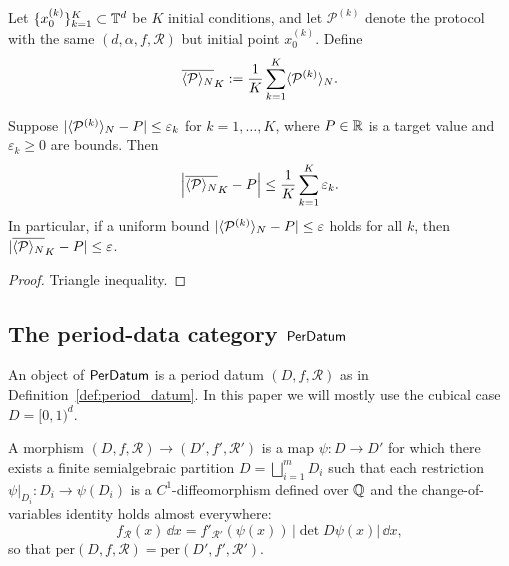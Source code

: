 \begin{definition}
\label{def:ensemble_mean}
Let $\{x_0^{(k)}\}_{k=1}^K\subset\mathbb{T}^d$ be $K$ initial conditions, and let $\mathcal{P}^{(k)}$ denote the protocol with the same $(d,\alpha,f,\mathcal{R})$ but initial point $x_0^{(k)}$. Define
\begin{equation}
\label{eq:ensemble_mean}
\overline{\langle \mathcal{P} \rangle_N}_{K}
:=\frac{1}{K}\sum_{k=1}^K \langle \mathcal{P}^{(k)} \rangle_N.
\end{equation}
\end{definition}

\begin{lemma}
\label{lem:ensemble_preserves_bounds}
Suppose $|\langle \mathcal{P}^{(k)} \rangle_N-P|\le \varepsilon_k$ for $k=1,\dots,K$, where $P\in\mathbb{R}$ is a target value and $\varepsilon_k\ge 0$ are bounds. Then
\[
\left|\overline{\langle \mathcal{P} \rangle_N}_{K}-P\right|
\le
\frac{1}{K}\sum_{k=1}^K \varepsilon_k.
\]
In particular, if a uniform bound $|\langle \mathcal{P}^{(k)} \rangle_N-P|\le \varepsilon$ holds for all $k$, then $|\overline{\langle \mathcal{P} \rangle_N}_{K}-P|\le \varepsilon$.
\end{lemma}

\begin{proof}
Triangle inequality.
\end{proof}

\subsection{The period-data category \texorpdfstring{$\mathsf{PerDatum}$}{PerDatum}}
\label{sec:perdatum_category}

\begin{definition}
\label{def:perdatum_object}
An object of $\mathsf{PerDatum}$ is a period datum $(D,f,\mathcal{R})$ as in Definition~\ref{def:period_datum}. In this paper we will mostly use the cubical case $D=[0,1)^d$.
\end{definition}

\begin{definition}
\label{def:perdatum_morphism}
A morphism $(D,f,\mathcal{R})\to(D',f',\mathcal{R}')$ is a map $\psi:D\to D'$ for which there exists a finite semialgebraic partition $D=\bigsqcup_{i=1}^m D_i$ such that each restriction $\psi|_{D_i}:D_i\to \psi(D_i)$ is a $C^1$-diffeomorphism defined over $\mathbb{Q}$ and the change-of-variables identity holds almost everywhere:
\begin{equation}
\label{eq:perdatum_morphism}
f_{\mathcal{R}}(x)\,\dd x = f'_{\mathcal{R}'}(\psi(x))\,\big|\det D\psi(x)\big|\,\dd x,
\end{equation}
so that $\mathrm{per}(D,f,\mathcal{R})=\mathrm{per}(D',f',\mathcal{R}')$.
\end{definition}

